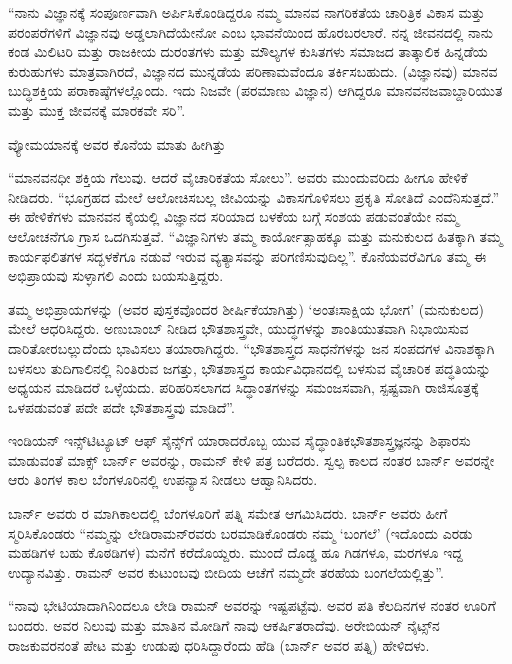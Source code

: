 \enginline{-}“ನಾನು ವಿಜ್ಞಾನಕ್ಕೆ ಸಂಪೂರ್ಣವಾಗಿ ಅರ್ಪಿಸಿಕೊಂಡಿದ್ದರೂ ನಮ್ಮ ಮಾನವ ನಾಗರಿಕತೆಯ ಚಾರಿತ್ರಿಕ ವಿಕಾಸ ಮತ್ತು ಪರಂಪರೆಗಳಿಗೆ ವಿಜ್ಞಾನವು ಅಡ್ಡಲಾಗಿದೆಯೇನೋ ಎಂಬ ಭಾವನೆಯಿಂದ ಹೊರಬರಲಾರೆ. ನನ್ನ ಜೀವನದಲ್ಲಿ ನಾನು ಕಂಡ ಮಿಲಿಟರಿ ಮತ್ತು ರಾಜಕೀಯ ದುರಂತಗಳು ಮತ್ತು ಮೌಲ್ಯಗಳ ಕುಸಿತಗಳು ಸಮಾಜದ ತಾತ್ಕಾಲಿಕ ಹಿನ್ನಡೆಯ ಕುರುಹುಗಳು ಮಾತ್ರವಾಗಿರದೆ, ವಿಜ್ಞಾನದ ಮುನ್ನಡೆಯ ಪರಿಣಾಮವೆಂದೂ ತರ್ಕಿಸಬಹುದು. (ವಿಜ್ಞಾನವು) ಮಾನವ ಬುದ್ಧಿಶಕ್ತಿಯ ಪರಾಕಾಷ್ಠೆಗಳಲ್ಲೊಂದು. ಇದು ನಿಜವೇ (ಪರಮಾಣು ವಿಜ್ಞಾನ) ಆಗಿದ್ದರೂ ಮಾನವನ\break ಜವಾಬ್ದಾರಿಯುತ ಮತ್ತು ಮುಕ್ತ ಜೀವನಕ್ಕೆ ಮಾರಕವೇ ಸರಿ”.

ವ್ಯೋಮಯಾನಕ್ಕೆ ಅವರ ಕೊನೆಯ ಮಾತು ಹೀಗಿತ್ತು\enginline{-}

“ಮಾನವನಧೀ ಶಕ್ತಿಯ ಗೆಲುವು. ಆದರೆ ವೈಚಾರಿಕತೆಯ ಸೋಲು”. ಅವರು ಮುಂದುವರಿದು ಹೀಗೂ ಹೇಳಿಕೆ ನೀಡಿದರು.\enginline{-} “ಭೂಗ್ರಹದ ಮೇಲೆ ಆಲೋಚಿಸಬಲ್ಲ ಜೀವಿಯನ್ನು ವಿಕಾಸಗೊಳಿಸಲು ಪ್ರಕೃತಿ ಸೋತಿದೆ ಎಂದೆನಿಸುತ್ತದೆ.” ಈ ಹೇಳಿಕೆಗಳು ಮಾನವನ ಕೈಯಲ್ಲಿ ವಿಜ್ಞಾನದ ಸರಿಯಾದ ಬಳಕೆಯ ಬಗ್ಗೆ ಸಂಶಯ ಪಡುವಂತೆಯೇ ನಮ್ಮ ಆಲೋಚನೆಗೂ ಗ್ರಾಸ ಒದಗಿಸುತ್ತವೆ. “ವಿಜ್ಞಾನಿಗಳು ತಮ್ಮ ಕಾರ್ಯೋತ್ಸಾಹಕ್ಕೂ ಮತ್ತು ಮನುಕುಲದ ಹಿತಕ್ಕಾಗಿ ತಮ್ಮ ಕಾರ್ಯಫಲಿತಗಳ ಸದ್ಭಳಕೆಗೂ ನಡುವೆ ಇರುವ ವ್ಯತ್ಯಾಸವನ್ನು ಪರಿಗಣಿಸುವುದಿಲ್ಲ”. ಕೊನೆಯವರೆವಿಗೂ ತಮ್ಮ ಈ ಅಭಿಪ್ರಾಯವು ಸುಳ್ಳಾಗಲಿ ಎಂದು ಬಯಸುತ್ತಿದ್ದರು.

ತಮ್ಮ ಅಭಿಪ್ರಾಯಗಳನ್ನು \textit{} (ಅವರ ಪುಸ್ತಕವೊಂದರ ಶೀರ್ಷಿಕೆ\-ಯಾಗಿತ್ತು)\enginline{-} ‘ಅಂತಃಸಾಕ್ಷಿಯ ಭೋಗ’ (ಮನುಕುಲದ) ಮೇಲೆ ಆಧರಿಸಿದ್ದರು. ಅಣುಬಾಂಬ್ ನೀಡಿದ ಭೌತಶಾಸ್ತ್ರವೇ, ಯುದ್ಧಗಳನ್ನು ಶಾಂತಿಯುತವಾಗಿ ನಿಭಾಯಿಸುವ ದಾರಿತೋರಬಲ್ಲುದೆಂದು ಭಾವಿಸಲು ತಯಾರಾಗಿದ್ದರು. “ಭೌತಶಾಸ್ತ್ರದ ಸಾಧನೆಗಳನ್ನು ಜನ ಸಂಪದಗಳ ವಿನಾಶಕ್ಕಾಗಿ ಬಳಸಲು ತುದಿಗಾಲಿನಲ್ಲಿ ನಿಂತಿರುವ ಜಗತ್ತು, ಭೌತಶಾಸ್ತ್ರದ ಕಾರ್ಯವಿಧಾನದಲ್ಲಿ ಬಳಸುವ ವೈಚಾರಿಕ ಪದ್ಧತಿಯನ್ನು ಅಧ್ಯಯನ ಮಾಡಿದರೆ ಒಳ್ಳೆಯದು. ಪರಿಹರಿಸಲಾಗದ ಸಿದ್ಧಾಂತಗಳನ್ನು ಸಮಂಜಸ\-ವಾಗಿ, ಸ್ಪಷ್ಟವಾಗಿ ರಾಜಿಸೂತ್ರಕ್ಕೆ ಒಳಪಡುವಂತೆ ಪದೇ ಪದೇ ಭೌತಶಾಸ್ತ್ರವು ಮಾಡಿದೆ”.

ಇಂಡಿಯನ್ ಇನ್ಸ್‌ಟಿಟ್ಯೂಟ್ ಆಫ್ ಸೈನ್ಸ್‌ಗೆ ಯಾರಾದರೊಬ್ಬ ಯುವ ಸೈದ್ಧಾಂತಿಕ\break ಭೌತಶಾಸ್ತ್ರಜ್ಞನನ್ನು ಶಿಫಾರಸು ಮಾಡುವಂತೆ ಮಾಕ್ಸ್ ಬಾರ್ನ್ ಅವರನ್ನು, ರಾಮನ್ ಕೇಳಿ ಪತ್ರ ಬರೆದರು. ಸ್ವಲ್ಪ ಕಾಲದ ನಂತರ ಬಾರ್ನ್ ಅವರನ್ನೇ ಆರು ತಿಂಗಳ ಕಾಲ ಬೆಂಗಳೂರಿನಲ್ಲಿ ಉಪನ್ಯಾಸ ನೀಡಲು ಆಹ್ವಾನಿಸಿದರು.

ಬಾರ್ನ್ ಅವರು ರ ಮಾಗಿಕಾಲದಲ್ಲಿ ಬೆಂಗಳೂರಿಗೆ ಪತ್ನಿ ಸಮೇತ ಆಗಮಿಸಿದರು. ಬಾರ್ನ್ ಅವರು ಹೀಗೆ ಸ್ಮರಿಸಿಕೊಂಡರು\enginline{-} “ನಮ್ಮನ್ನು ಲೇಡಿರಾಮನ್‍ರವರು ಬರಮಾಡಿಕೊಂಡರು ನಮ್ಮ ‘ಬಂಗಲೆ’ \enginline{-}(ಇದೊಂದು ಎರಡು ಮಹಡಿಗಳ ಬಹು ಕೊಠಡಿಗಳ) ಮನೆಗೆ ಕರೆದೊಯ್ದರು. ಮುಂದೆ ದೊಡ್ಡ ಹೂ ಗಿಡಗಳೂ, ಮರಗಳೂ ಇದ್ದ ಉದ್ಯಾನವಿತ್ತು. ರಾಮನ್ ಅವರ ಕುಟುಂಬವು ಬೀದಿಯ ಆಚೆಗೆ ನಮ್ಮದೇ ತರಹೆಯ ಬಂಗಲೆಯಲ್ಲಿತ್ತು”.

“ನಾವು ಭೇಟಿಯಾದಾಗಿನಿಂದಲೂ ಲೇಡಿ ರಾಮನ್ ಅವರನ್ನು ಇಷ್ಟಪಟ್ಟೆವು. ಅವರ ಪತಿ ಕೆಲದಿನಗಳ ನಂತರ ಊರಿಗೆ ಬಂದರು. ಅವರ ನಿಲುವು ಮತ್ತು ಮಾತಿನ ಮೋಡಿಗೆ ನಾವು ಆಕರ್ಷಿತರಾದೆವು. ಅರೇಬಿಯನ್ ನೈಟ್ಸ್‌ನ ರಾಜಕುವರನಂತೆ ಪೇಟ ಮತ್ತು ಉಡುಪು ಧರಿಸಿದ್ದಾರೆಂದು ಹೆಡಿ (ಬಾರ್ನ್ ಅವರ ಪತ್ನಿ) ಹೇಳಿದಳು.

